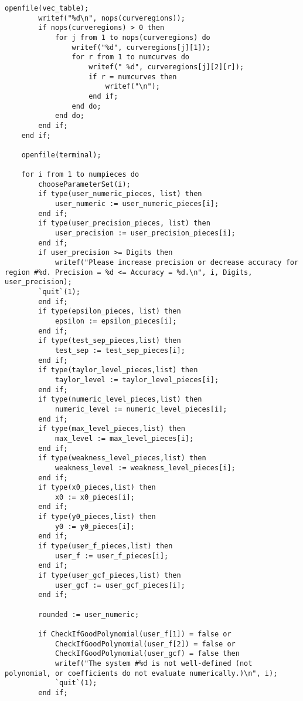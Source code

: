 \documentclass[a4paper,10pt]{article}
\begin{document}
\begin{lstlisting}[name=main]
        openfile(vec_table);
        writef("%d\n", nops(curveregions));
        if nops(curveregions) > 0 then
            for j from 1 to nops(curveregions) do
                writef("%d", curveregions[j][1]);
                for r from 1 to numcurves do
                    writef(" %d", curveregions[j][2][r]);
                    if r = numcurves then
                        writef("\n");
                    end if;
                end do;
            end do;
        end if;
    end if;

    openfile(terminal);

    for i from 1 to numpieces do
        chooseParameterSet(i);
        if type(user_numeric_pieces, list) then
            user_numeric := user_numeric_pieces[i];
        end if;
        if type(user_precision_pieces, list) then
            user_precision := user_precision_pieces[i];
        end if;
        if user_precision >= Digits then
            writef("Please increase precision or decrease accuracy for region #%d. Precision = %d <= Accuracy = %d.\n", i, Digits, user_precision);
        `quit`(1);
        end if;
        if type(epsilon_pieces, list) then
            epsilon := epsilon_pieces[i];
        end if;
        if type(test_sep_pieces,list) then
            test_sep := test_sep_pieces[i];
        end if;
        if type(taylor_level_pieces,list) then
            taylor_level := taylor_level_pieces[i];
        end if;
        if type(numeric_level_pieces,list) then
            numeric_level := numeric_level_pieces[i];
        end if;
        if type(max_level_pieces,list) then
            max_level := max_level_pieces[i];
        end if;
        if type(weakness_level_pieces,list) then
            weakness_level := weakness_level_pieces[i];
        end if;
        if type(x0_pieces,list) then
            x0 := x0_pieces[i];
        end if;
        if type(y0_pieces,list) then
            y0 := y0_pieces[i];
        end if;
        if type(user_f_pieces,list) then
            user_f := user_f_pieces[i];
        end if;
        if type(user_gcf_pieces,list) then
            user_gcf := user_gcf_pieces[i];
        end if;

        rounded := user_numeric;

        if CheckIfGoodPolynomial(user_f[1]) = false or
            CheckIfGoodPolynomial(user_f[2]) = false or
            CheckIfGoodPolynomial(user_gcf) = false then
            writef("The system #%d is not well-defined (not polynomial, or coefficients do not evaluate numerically.)\n", i);
            `quit`(1);
        end if;


\end{lstlisting}
\end{document}

